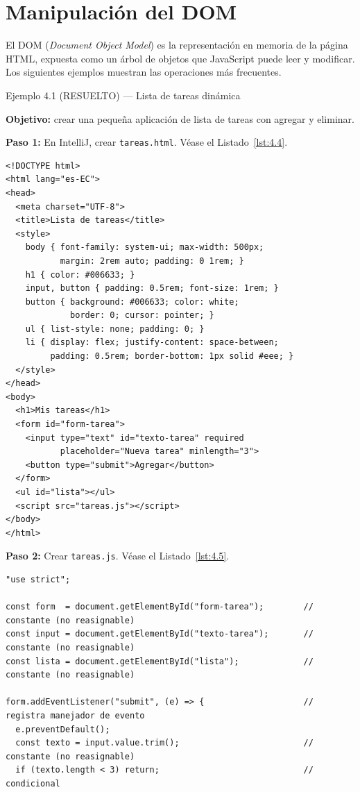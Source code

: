 \section{Manipulación del DOM}

El DOM (\emph{Document Object Model}) es la representación
en memoria de la página HTML, expuesta como un árbol de objetos que
JavaScript puede leer y modificar. Los siguientes ejemplos muestran
las operaciones más frecuentes.


\begin{cajaejemplo}{Ejemplo 4.1 (RESUELTO) --- Lista de tareas dinámica}

\textbf{Objetivo:} crear una pequeña aplicación de lista de tareas
con agregar y eliminar.

\textbf{Paso 1:} En IntelliJ, crear \texttt{tareas.html}. V\'ease el Listado~\ref{lst:4.4}.

\begin{lstlisting}[style=html,caption={tareas.html},label=lst:4.4]
<!DOCTYPE html>
<html lang="es-EC">
<head>
  <meta charset="UTF-8">
  <title>Lista de tareas</title>
  <style>
    body { font-family: system-ui; max-width: 500px;
           margin: 2rem auto; padding: 0 1rem; }
    h1 { color: #006633; }
    input, button { padding: 0.5rem; font-size: 1rem; }
    button { background: #006633; color: white;
             border: 0; cursor: pointer; }
    ul { list-style: none; padding: 0; }
    li { display: flex; justify-content: space-between;
         padding: 0.5rem; border-bottom: 1px solid #eee; }
  </style>
</head>
<body>
  <h1>Mis tareas</h1>
  <form id="form-tarea">
    <input type="text" id="texto-tarea" required
           placeholder="Nueva tarea" minlength="3">
    <button type="submit">Agregar</button>
  </form>
  <ul id="lista"></ul>
  <script src="tareas.js"></script>
</body>
</html>
\end{lstlisting}

\textbf{Paso 2:} Crear \texttt{tareas.js}. V\'ease el Listado~\ref{lst:4.5}.

\begin{lstlisting}[style=js,caption={tareas.js},label=lst:4.5]
"use strict";

const form  = document.getElementById("form-tarea");        // constante (no reasignable)
const input = document.getElementById("texto-tarea");       // constante (no reasignable)
const lista = document.getElementById("lista");             // constante (no reasignable)

form.addEventListener("submit", (e) => {                    // registra manejador de evento
  e.preventDefault();
  const texto = input.value.trim();                         // constante (no reasignable)
  if (texto.length < 3) return;                             // condicional


\end{lstlisting}
\end{cajaejemplo}
